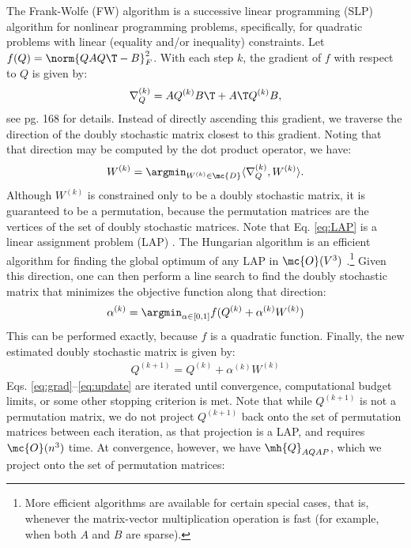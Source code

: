The Frank-Wolfe (FW) algorithm is a successive linear programming (SLP) \cite{} algorithm for nonlinear programming problems, specifically, for quadratic problems with linear (equality and/or inequality) constraints. Let $f(Q)=\norm{QAQ\T-B}_F^2$.  With each step $k$, the gradient of $f$ with respect to $Q$ is given by:
\begin{align} \label{eq:grad}
	\nabla_Q^{(k)} = A Q^{(k)} B\T + A\T Q^{(k)} B, 
\end{align}
see \cite{MDS} pg. 168 for details. Instead of directly ascending this gradient, we traverse the direction of the doubly stochastic matrix closest to this gradient. Noting that that direction may be computed by the dot product operator, we have:
\begin{align}\label{eq:LAP}
	W^{(k)} = \argmin_{W^{(k)} \in \mc{D}} \langle \nabla_Q^{(k)},W^{(k)} \rangle. %
\end{align}
Although $W^{(k)}$ is constrained only to be a doubly stochastic matrix, it is guaranteed to be a permutation, because the permutation matrices are the vertices of the set of doubly stochastic matrices.  Note that Eq. \eqref{eq:LAP} is a linear assignment problem (LAP) \cite{}.  The Hungarian algorithm is an efficient algorithm for finding the global optimum of any LAP in $\mc{O}(V^3)$ \cite{}.\footnote{More efficient algorithms are available for certain special cases, that is, whenever the matrix-vector multiplication operation is fast (for example, when both $A$ and $B$ are sparse).} Given this direction, one can then perform a line search to find the doubly stochastic matrix that minimizes the objective function along that direction:
\begin{align}
	\alpha^{(k)} = \argmin_{\alpha \in [0,1]} f(Q^{(k)} + \alpha^{(k)} W^{(k)})
\end{align}
This can be performed exactly, because $f$ is a quadratic function.  Finally, the new estimated doubly stochastic matrix is given by:
\begin{align}\label{eq:update}
	Q^{(k+1)} = Q^{(k)} + \alpha^{(k)} W^{(k)}
\end{align}
Eqs. \eqref{eq:grad}--\eqref{eq:update} are iterated until convergence, computational budget limits, or some other stopping criterion is met.  Note that while $Q^{(k+1)}$ is not a permutation matrix, we do not project $Q^{(k+1)}$ back onto the set of permutation matrices between each iteration, as that projection is a LAP, and requires $\mc{O}(n^3)$ time. At convergence, however, we have $\mh{Q}_{AQAP}$, which we project onto the set of permutation matrices:
